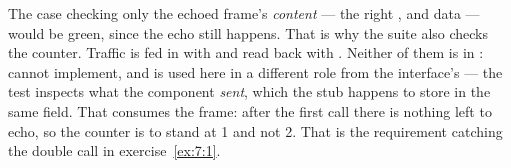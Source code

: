  The case checking only the echoed frame's \emph{content} --- the right ,
 and data --- would be green, since the echo still happens. That is why the suite also
checks the counter.
 Traffic is fed in with  and read back with .
Neither of them is in :   cannot implement, and
 is used here in a different role from the interface's --- the test inspects what
the component \emph{sent}, which the stub happens to store in the same field.
 That  consumes the frame: after the first call there is nothing left to echo,
so the counter is to stand at 1 and not 2. That is the requirement catching the double call in
exercise~\ref{ex:7:1}.
